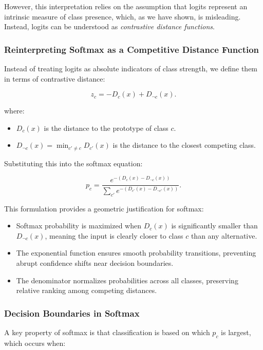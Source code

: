 \documentclass[12pt]{article}
\begin{document}
However, this interpretation relies on the assumption that logits represent an intrinsic measure of class presence, which, as we have shown, is misleading. Instead, logits can be understood as \textit{contrastive distance functions}.

\subsubsection{Reinterpreting Softmax as a Competitive Distance Function}

Instead of treating logits as absolute indicators of class strength, we define them in terms of contrastive distance:

\[
z_c = -D_c(x) + D_{\neg c}(x).
\]

where:

\begin{itemize}
    \item \( D_c(x) \) is the distance to the prototype of class \( c \).
    \item \( D_{\neg c}(x) = \min_{c' \neq c} D_{c'}(x) \) is the distance to the closest competing class.
\end{itemize}

Substituting this into the softmax equation:

\[
p_c = \frac{e^{-(D_c(x) - D_{\neg c}(x))}}{\sum_{c'} e^{-(D_{c'}(x) - D_{\neg c'}(x))}}.
\]

This formulation provides a geometric justification for softmax:

\begin{itemize}
    \item Softmax probability is maximized when \( D_c(x) \) is significantly smaller than \( D_{\neg c}(x) \), meaning the input is clearly closer to class \( c \) than any alternative.
    \item The exponential function ensures smooth probability transitions, preventing abrupt confidence shifts near decision boundaries.
    \item The denominator normalizes probabilities across all classes, preserving relative ranking among competing distances.
\end{itemize}

\subsubsection{Decision Boundaries in Softmax}

A key property of softmax is that classification is based on which \( p_c \) is largest, which occurs when:
\end{document}
